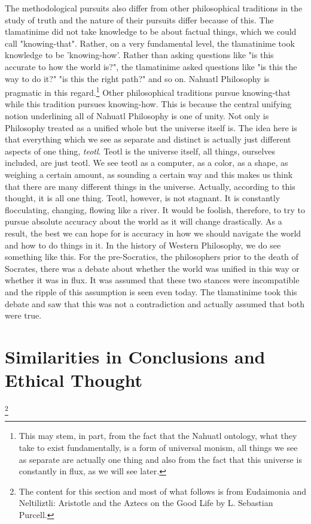 The methodological pursuits also differ from other philosophical traditions in the study of truth and the nature of their pursuits differ because of this. The tlamatinime did not take knowledge to be about factual things, which we could call "knowing-that". Rather, on a very fundamental level, the tlamatinime took knowledge to be 'knowing-how'. Rather than asking questions like "is this accurate to how the world is?", the tlamatinime asked questions like "is this the way to do it?" "is this the right path?" and so on. Nahuatl Philosophy is pragmatic in this regard.\footnote{This may stem, in part, from the fact that the Nahuatl ontology, what they take to exist fundamentally, is a form of universal monism, all things we see as separate are actually one thing and also from the fact that this universe is constantly in flux, as we will see later.} Other philosophical traditions pursue knowing-that while this tradition pursues knowing-how. This is because the central unifying notion underlining all of Nahuatl Philosophy is one of unity. Not only is Philosophy treated as a unified whole but the universe itself is. The idea here is that everything which we see as separate and distinct is actually just different aspects of one thing, \emph{teotl}. Teotl is the universe itself, all things, ourselves included, are just teotl. We see teotl as a computer, as a color, as a shape, as weighing a certain amount, as sounding a certain way and this makes us think that there are many different things in the universe. Actually, according to this thought, it is all one thing. Teotl, however, is not stagnant. It is constantly flocculating, changing, flowing like a river. It would be foolish, therefore, to try to pursue absolute accuracy about the world as it will change drastically. As a result, the best we can hope for is accuracy in how we should navigate the world and how to do things in it. In the history of Western Philosophy, we do see something like this. For the pre-Socratics, the philosophers prior to the death of Socrates, there was a debate about whether the world was unified in this way or whether it was in flux. It was assumed that these two stances were incompatible and the ripple of this assumption is seen even today. The tlamatinime took this debate and saw that this was not a contradiction and actually assumed that both were true. 

\section{Similarities in Conclusions and Ethical Thought}\footnote{The content for this section and most of what follows is from Eudaimonia and Neltiliztli: Aristotle and the Aztecs on the Good Life
by L. Sebastian Purcell.\autocite{Purcell1}} 


